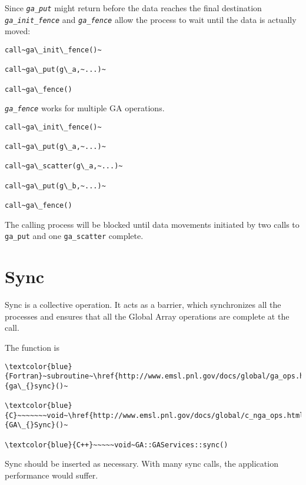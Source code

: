 \textit{}

Since \texttt{\emph{ga\_put}} might return before the data reaches
the final destination \texttt{\emph{ga\_init\_fence}} and \texttt{\emph{ga\_fence}}
allow the process to wait until the data is actually moved:
\begin{verbatim}
call~ga\_init\_fence()~

call~ga\_put(g\_a,~...)~

call~ga\_fence()
\end{verbatim}
\textit{}

\texttt{\emph{ga\_fence}} works for multiple GA operations.
\begin{verbatim}
call~ga\_init\_fence()~

call~ga\_put(g\_a,~...)~

call~ga\_scatter(g\_a,~...)~

call~ga\_put(g\_b,~...)~

call~ga\_fence()
\end{verbatim}
The calling process will be blocked until data movements initiated
by two calls to \texttt{ga\_put} and one \texttt{ga\_scatter} complete. 


\section{Sync }

Sync is a collective operation. It acts as a barrier, which synchronizes
all the processes and ensures that all the Global Array operations
are complete at the call.

The function is
\begin{verbatim}
\textcolor{blue}{Fortran}~subroutine~\href{http://www.emsl.pnl.gov/docs/global/ga_ops.html\#ga_sync}{ga\_{}sync}()~

\textcolor{blue}{C}~~~~~~~void~\href{http://www.emsl.pnl.gov/docs/global/c_nga_ops.html\#ga_sync}{GA\_{}Sync}()~

\textcolor{blue}{C++}~~~~~void~GA::GAServices::sync()
\end{verbatim}
Sync should be inserted as necessary. With many sync calls, the application
performance would suffer. 
